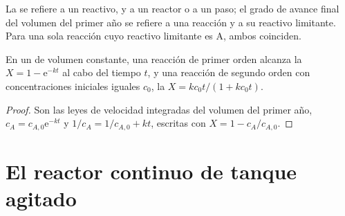 La  se refiere a un reactivo, y a un reactor o a un paso; el grado de avance
final del volumen del primer año se refiere a una reacción y a su
reactivo limitante. Para una sola reacción cuyo reactivo limitante es A, ambos
coinciden.

\begin{proposition}\label{prop:b2:continuous-reactors:batch}
En un  de volumen constante, una reacción de primer orden alcanza la
 $X = 1 - \mathrm e^{-kt}$ al cabo del tiempo $t$, y una reacción de segundo
orden con concentraciones iniciales iguales $c_0$, la  $X =
kc_0t/(1 + kc_0t)$.
\end{proposition}

\begin{proof}
Son las leyes de velocidad integradas del volumen del primer año, $c_A = c_{A,0}
\mathrm e^{-kt}$ y $1/c_A = 1/c_{A,0} + kt$, escritas con $X = 1 -
c_A/c_{A,0}$.
\end{proof}

\section{El reactor continuo de tanque agitado}

